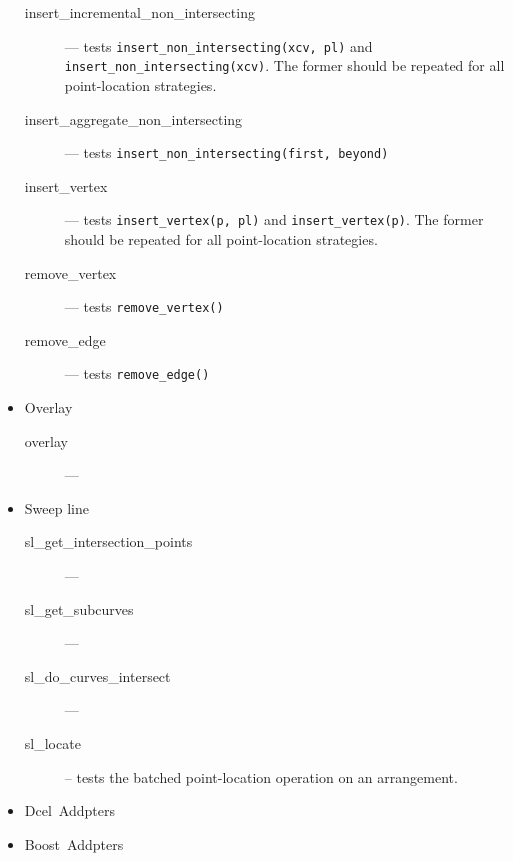 \documentclass[11pt,a4paper]{article}
\newcommand{\dcel}{{\sc Dcel}}
\newcommand{\boost}{{\sc Boost}}
\begin{document}
\begin{itemize}
\begin{description}
  \item[insert\_incremental\_non\_intersecting] --- tests
    {\tt insert\_non\_intersecting(xcv, pl)} and
    {\tt insert\_non\_intersecting(xcv)}. The former should be
    repeated for all point-location strategies.
  \item[insert\_aggregate\_non\_intersecting] --- tests
    {\tt insert\_non\_intersecting(first, beyond)}
  \item[insert\_vertex] --- tests {\tt insert\_vertex(p, pl)} and
    {\tt insert\_vertex(p)}. The former should be repeated for all
    point-location strategies.
  \item[remove\_vertex] --- tests {\tt remove\_vertex()}
  \item[remove\_edge] --- tests {\tt remove\_edge()}
  \end{description}
\item Overlay
  \begin{description}
  \item[overlay] --- 
  \end{description}
\item Sweep line
  \begin{description}
  \item[sl\_get\_intersection\_points] ---
  \item[sl\_get\_subcurves] ---
  \item[sl\_do\_curves\_intersect] ---
  \item[sl\_locate] -- tests the batched point-location operation on
    an arrangement.
  \end{description}
\item \dcel\ Addpters
\item \boost\ Addpters
\end{itemize}
\end{document}
